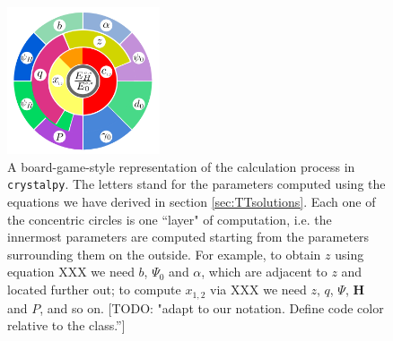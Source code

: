 \documentclass[preprint]{iucr}              %
\newcommand{\todo}[1]{{\color{red}[TODO: "#1'']}}
\begin{document}
\begin{figure}
    \centering
    \includegraphics[width=0.4\textwidth]{figures/edo_matryoshka.png}
    \caption{A board-game-style representation of the calculation process in {\tt crystalpy}. The letters stand for the parameters computed using the equations we have derived in section \ref{sec:TTsolutions}. Each one of the concentric circles is one ``layer" of computation, i.e. the innermost parameters are computed starting from the parameters surrounding them on the outside. 
    For example, to obtain $z$ using equation XXX we need $b$, $\Psi_0$  and $\alpha$, which are adjacent to $z$ and located further out; to compute $x_{1,2}$ via XXX we need $z$, $q$, $\Psi$, \textbf{H} and $P$, and so on. \todo{adapt to our notation. Define code color relative to the class.}}
    \label{fig:edo_matryoshka}
\end{figure}



\end{document}
